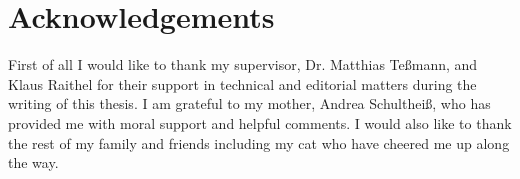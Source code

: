 
\chapter*{Acknowledgements}

First of all I would like to thank my supervisor, Dr. Matthias Teßmann, and Klaus Raithel for their support in technical and editorial matters during the writing of this thesis. I am grateful to my mother, Andrea Schultheiß, who has provided me with moral support and helpful comments. I would also like to thank the rest of my family and friends including my cat who have cheered me up along the way.

